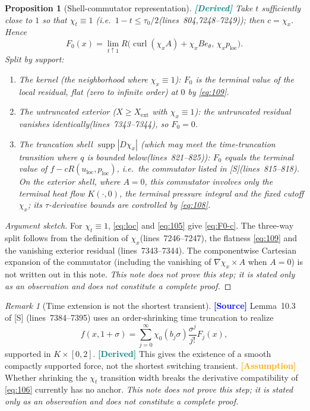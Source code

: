\documentclass[11pt,a4paper]{article}
\newtheorem{proposition}[theorem]{Proposition}
\theoremstyle{definition}
\theoremstyle{remark}
\newtheorem{remark}[theorem]{Remark}
\newcommand{\lnos}[1]{(lines~#1)}
\newcommand{\ORIG}{\textcolor{blue}{\textbf{[Source]}}}
\newcommand{\DER}{\textcolor{teal}{\textbf{[Derived]}}}
\newcommand{\HYP}{\textcolor{orange}{\textbf{[Assumption]}}}
\newcommand{\notproved}{\emph{This note does not prove this step; it is stated only as an observation
and does not constitute a complete proof.}}
\begin{document}
\begin{proposition}[Shell-commutator representation]
\label{prop:shell}
\DER
Take $t$ sufficiently close to $1$ so that $\chi_t\equiv 1$ (i.e.\ $1-t\le\tau_0/2$\lnos{804,7248--7249});
then $c=\chi_x$. Hence
\begin{equation}
\label{eq:F0-c}
F_0(x)
=\lim_{t\uparrow 1}
R\bigl(\operatorname{curl}(\chi_x A)+\chi_x B e_\theta,\,\chi_x p_{\mathrm{loc}}\bigr).
\end{equation}
Split by support:
\begin{enumerate}
\item \emph{The kernel} (the neighborhood where $\chi_x\equiv 1$): $F_0$ is the terminal value of the
local residual, flat (zero to infinite order) at $0$ by \eqref{eq:109}.
\item \emph{The untruncated exterior} ($X\ge X_{\mathrm{ext}}$ with $\chi_x\equiv 1$):
the untruncated residual vanishes identically\lnos{7343--7344}, so $F_0=0$.
\item \emph{The truncation shell} $\operatorname{supp}|D\chi_x|$
(which may meet the time-truncation transition where $q$ is bounded below\lnos{821--825}):
$F_0$ equals the terminal value of $f-c R(u_{\mathrm{loc}},p_{\mathrm{loc}})$, i.e.\ the commutator
listed in [S]\lnos{815--818}.
On the exterior shell, where $A=0$, this commutator involves only the terminal heat flow $K(\cdot,0)$,
the terminal pressure integral and the fixed cutoff $\chi_x$; its $\tau$-derivative bounds are controlled
by \eqref{eq:108}.
\end{enumerate}
\end{proposition}

\begin{proof}[Argument sketch]
For $\chi_t\equiv 1$, \eqref{eq:loc} and \eqref{eq:105} give \eqref{eq:F0-c}.
The three-way split follows from the definition of $\chi_x$\lnos{7246--7247}, the flatness
\eqref{eq:109} and the vanishing exterior residual \lnos{7343--7344}.
The componentwise Cartesian expansion of the commutator (including the vanishing of
$\nabla\chi_x\times A$ when $A=0$) is not written out in this note.
\notproved
\end{proof}

\begin{remark}[Time extension is not the shortest transient]
\ORIG
Lemma~10.3 of [S] \lnos{7384--7395} uses an order-shrinking time truncation to realize
\begin{equation}
\label{eq:1011}
f(x,1+\sigma)=\sum_{j=0}^\infty\chi_0(b_j\sigma)\frac{\sigma^j}{j!}F_j(x),
\end{equation}
supported in $K\times[0,2]$.
\DER
This gives the existence of a smooth compactly supported force, not the shortest switching transient.
\HYP
Whether shrinking the $\chi_t$ transition width breaks the derivative compatibility of \eqref{eq:106}
currently has no anchor.
\notproved
\end{remark}
\end{document}
